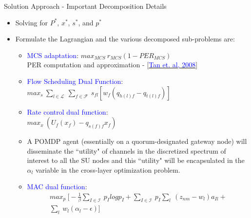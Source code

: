 \documentclass{beamer}
\begin{document}
\begin{frame}{Solution Approach - Important Decomposition Details }
\begin{itemize}
    \item Solving for $P^*$, $x^*$, $s^*$, and $p^*$
    \item Formulate the Lagrangian and the various decomposed sub-problems are:
    \begin{itemize}
        \item \textcolor{blue}{MCS adaptation}: $max_{MCS}\ r_{MCS}(1 - PER_{MCS})$
        \\PER computation and approximation - [\href{https://ieeexplore.ieee.org/document/4641969}{\textcolor{blue}{Tan et. al, 2008}}]
        \item \textcolor{blue}{Flow Scheduling Dual Function}:
        $max_{s}\ \sum_{l \in \mathcal{L}}\ \sum_{f \in \mathcal{F}}\ s_{fl}[w_f(q_{h(l)f} - q_{t(l)f})]$
        \item \textcolor{blue}{Rate control dual function}:
        \\$max_x\ (U_f(x_f) - q_{s(f)f}x_f)$
        \item A POMDP agent (essentially on a quorum-designated gateway node) will disseminate the ``utility" of channels in the discretized spectrum of interest to all the SU nodes and this ``utility" will be encapsulated in the $\alpha_l$ variable in the cross-layer optimization problem.
        \item \textcolor{blue}{MAC dual function}:
        \begin{equation*}
            \begin{aligned}
                max_p\ \Big[- \frac{1}{\beta}\sum_{I \in \mathcal{I}}\ p_I log p_I + \sum_{I \in \mathcal{I}}\ p_I\sum_{l}\ (z_{nm} - w_l)a_{Il} + \\\sum_{l}\ w_l(\alpha_l - \epsilon)\Big]
            \end{aligned}
        \end{equation*}
    \end{itemize}
\end{itemize}
\vskip 1cm    
\end{frame}
\end{document}
